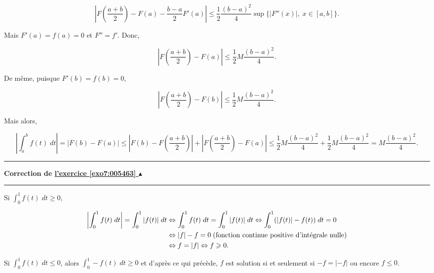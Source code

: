 \documentclass[11pt,a4paper]{article}
\newcounter{exo}
\newcommand{\correction}[1]{\hypertarget{cor7:#1}{}\label{cor7:#1}{\bf Correction de \hyperlink{exo7:#1}{l'exercice \ref{exo7:#1} $\blacktriangle$}}\vspace{1mm}\hrule\vspace{1mm}}
\newcommand{\fincorrection}{\vspace{1mm}\hrule\vspace*{7mm}}
\begin{document}
$$|F(\frac{a+b}{2})-F(a)-\frac{b-a}{2}F'(a)|\leq\frac{1}{2}\frac{(b-a)^2}{4}\sup\{|F''(x)|,\;x\in[a,b]\}.$$

Mais $F'(a)=f(a)=0$ et $F''=f'$. Donc,

$$|F(\frac{a+b}{2})-F(a)|\leq\frac{1}{2}M\frac{(b-a)^2}{4}.$$

De même, puisque $F'(b)=f(b)=0$,

$$|F(\frac{a+b}{2})-F(b)|\leq\frac{1}{2}M\frac{(b-a)^2}{4}.$$

Mais alors,

$$\left|\int_{a}^{b}f(t)\;dt\right|=|F(b)-F(a)|\leq|F(b)-F(\frac{a+b}{2})|+|F(\frac{a+b}{2})-F(a)|\leq\frac{1}{2}M\frac{(b-a)^2}{4}+\frac{1}{2}M\frac{(b-a)^2}{4}=M\frac{(b-a)^2}{4}.$$
\fincorrection
\correction{005463}
Si $\int_{0}^{1}f(t)\;dt\geq0$,

\begin{align*}\ensuremath
\left|\int_{0}^{1}f(t)\;dt\right|=\int_{0}^{1}|f(t)|\;dt&\Leftrightarrow\int_{0}^{1}f(t)\;dt=\int_{0}^{1}|f(t)|\;dt\Leftrightarrow
\int_{0}^{1}(|f(t)|-f(t))\;dt=0\\
 &\Leftrightarrow|f|-f=0\;(\mbox{fonction continue positive d'intégrale nulle})\\
 &\Leftrightarrow f=|f|\Leftrightarrow f\geq0.
\end{align*}

Si $\int_{0}^{1}f(t)\;dt\leq0$, alors $\int_{0}^{1}-f(t)\;dt\geq0$ et d'après ce qui précède, $f$ est solution si et seulement si $-f=|-f|$ ou encore $f\leq0$.
\end{document}
